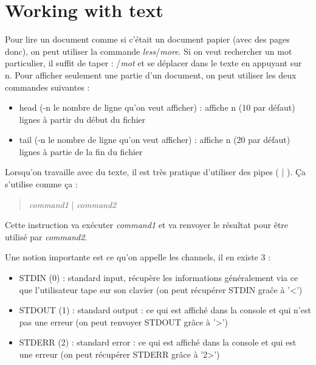 \documentclass{article}
\begin{document}
\newpage
\section{Working with text}
Pour lire un document comme si c'était un document papier (avec des pages donc), on peut utiliser la commande \textit{less}/\textit{more}. Si on veut rechercher un mot particulier, il suffit de taper : /\textit{mot} et se déplacer dans le texte en appuyant sur n.\newline
Pour afficher seulement une partie d'un document, on peut utiliser les deux commandes suivantes :
\begin{itemize}
    \item head (-n le nombre de ligne qu'on veut afficher) : affiche n (10 par défaut) lignes à partir du début du fichier
    \item tail (-n le nombre de ligne qu'on veut afficher) : affiche n (20 par défaut) lignes à partie de la fin du fichier 
\end{itemize}

Lorsqu'on travaille avec du texte, il est très pratique d'utiliser des pipes ( | ). Ça s'utilise comme ça :
\begin{quote}
    \textit{command1} | \textit{command2}
\end{quote}
Cette instruction va exécuter \textit{command1} et va renvoyer le résultat pour être utilisé par \textit{command2}.

Une notion importante est ce qu'on appelle les channels, il en existe 3 :
\begin{itemize}
    \item STDIN (0) : standard input, récupère les informations généralement via ce que l'utilisateur tape sur son clavier (on peut récupérer STDIN graĉe à '<')
    \item STDOUT (1) : standard output : ce qui est affiché dans la console et qui n'est pas une erreur (on peut renvoyer STDOUT grâce à '>')
    \item STDERR (2) : standard error : ce qui est affiché dans la console et qui est une erreur (on peut récupérer STDERR grâce à '2>')
\end{itemize}
\end{document}
